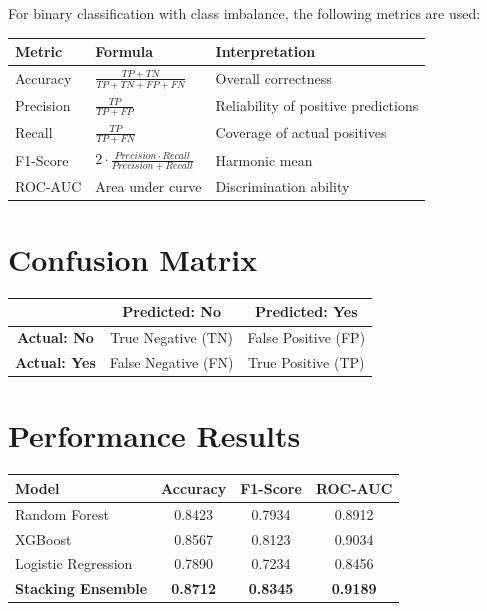 \documentclass[12pt,a4paper]{report}
\begin{document}
For binary classification with class imbalance, the following metrics are used:

\begin{center}
\begin{tabular}{|l|l|l|}
\hline
\textbf{Metric} & \textbf{Formula} & \textbf{Interpretation} \\
\hline
Accuracy & $\frac{TP+TN}{TP+TN+FP+FN}$ & Overall correctness \\
\hline
Precision & $\frac{TP}{TP+FP}$ & Reliability of positive predictions \\
\hline
Recall & $\frac{TP}{TP+FN}$ & Coverage of actual positives \\
\hline
F1-Score & $2 \cdot \frac{Precision \cdot Recall}{Precision + Recall}$ & Harmonic mean \\
\hline
ROC-AUC & Area under curve & Discrimination ability \\
\hline
\end{tabular}
\end{center}

\section{Confusion Matrix}

\begin{center}
\begin{tabular}{|c|c|c|}
\hline
& \textbf{Predicted: No} & \textbf{Predicted: Yes} \\
\hline
\textbf{Actual: No} & True Negative (TN) & False Positive (FP) \\
\hline
\textbf{Actual: Yes} & False Negative (FN) & True Positive (TP) \\
\hline
\end{tabular}
\end{center}

\section{Performance Results}

\begin{center}
\begin{tabular}{|l|c|c|c|}
\hline
\textbf{Model} & \textbf{Accuracy} & \textbf{F1-Score} & \textbf{ROC-AUC} \\
\hline
Random Forest & 0.8423 & 0.7934 & 0.8912 \\
\hline
XGBoost & 0.8567 & 0.8123 & 0.9034 \\
\hline
Logistic Regression & 0.7890 & 0.7234 & 0.8456 \\
\hline
\textbf{Stacking Ensemble} & \textbf{0.8712} & \textbf{0.8345} & \textbf{0.9189} \\
\hline
\end{tabular}
\end{center}
\end{document}
